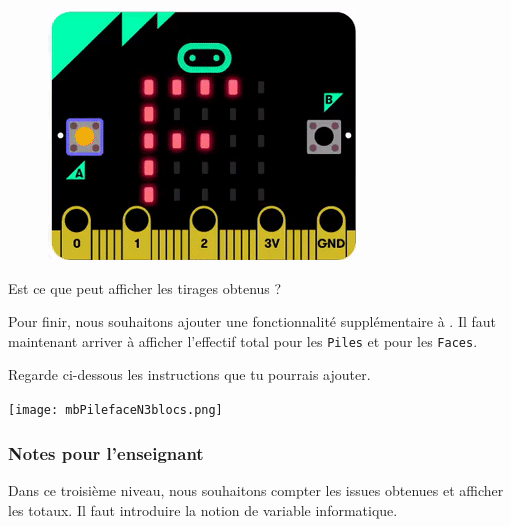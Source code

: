 \begin{figure}
    \includegraphics[width=\linewidth]{res/mbPileFaceN2.png}
\end{figure}
\begin{eleve}
Est ce que \mb peut afficher les tirages obtenus ?

Pour finir, nous souhaitons ajouter une fonctionnalité supplémentaire à \mb. Il faut maintenant arriver à afficher l'effectif total pour les \texttt{Piles} et pour les \texttt{Faces}.

Regarde ci-dessous les instructions que tu pourrais ajouter.

\centerline{\texttt{[image: mbPilefaceN3blocs.png]}}
\end{eleve}



\newpage
\subsubsection{Notes pour l'enseignant}

Dans ce troisième niveau, nous souhaitons compter les issues obtenues et afficher les totaux. Il faut introduire la notion de variable informatique.

